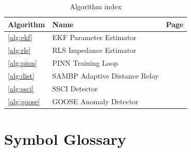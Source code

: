 \documentclass[11pt,a4paper]{report}
\begin{document}
\begin{table}[ht]
\centering
\caption{Algorithm index}
\begin{tabular}{lll}
\toprule
Algorithm & Name & Page \\
\midrule
\ref{alg:ekf} & EKF Parameter Estimator & \pageref{alg:ekf} \\
\ref{alg:rls} & RLS Impedance Estimator & \pageref{alg:rls} \\
\ref{alg:pinn} & PINN Training Loop & \pageref{alg:pinn} \\
\ref{alg:dist} & SAMBP Adaptive Distance Relay & \pageref{alg:dist} \\
\ref{alg:ssci} & SSCI Detector & \pageref{alg:ssci} \\
\ref{alg:goose} & GOOSE Anomaly Detector & \pageref{alg:goose} \\
\bottomrule
\end{tabular}
\end{table}

\chapter{Symbol Glossary}
\label{app:symbols}
\end{document}
